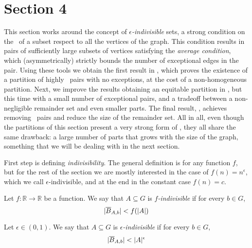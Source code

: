 \section{Section 4} \label{sec:section_4}

    This section works around the concept of \emph{$\epsilon$-indivisible} sets, a strong condition on the \regularity~of a subset
    respect to all the vertices of the graph.
    This condition results in pairs of sufficiently large subsets of vertices satisfying
    the \emph{average condition}, which (asymmetrically) strictly bounds the number of exceptional edges in the pair.
    Using these tools we obtain the first result in ,
    which proves the existence of a partition of highly \regular~pairs with no exceptions, at the cost of a
    non-homogeneous partition.
    Next, we improve the results obtaining an equitable partition in
    , but this time with a
    small number of exceptional pairs, and a tradeoff between a non-negligible remainder set and even smaller parts.
    The final result, , achieves removing \irregular~pairs
    and reduce the size of the remainder set.
    All in all, even though the partitions of this section present a very strong form of \regularity, they all share
    the same drawback: a large number of parts that grows with the size of the graph, something that we will be dealing
    with in the next section.

    First step is defining \emph{indivisibility}.
    The general definition is for any function $f$, but for the rest of the section we are mostly interested in the case
    of $f(n) = n^\epsilon$, which we call $\epsilon$-indivisible, and at the end in the constant case $f(n) = c$.

    \begin{definition}[Definition 4.2(b)] \label{def:f_indivisible}
        Let $f: \mathbb{R} \longrightarrow \mathbb{R}$ be a function.
        We say that $A \subseteq G$ is \emph{$f$-indivisible} if for every $b \in G$,
        \[
            | \overline{B}_{A,b} | < f(|A|)
        \]
    \end{definition}

    \begin{definition}[Definition 4.2(a)] \label{def:epsilon_indivisible}
        Let $\epsilon \in (0,1)$.
        We say that $A \subseteq G$ is \emph{$\epsilon$-indivisible} if for every $b \in G$,
        \[
            | \overline{B}_{A,b} | < |A|^{\epsilon}
        \]
    \end{definition}

